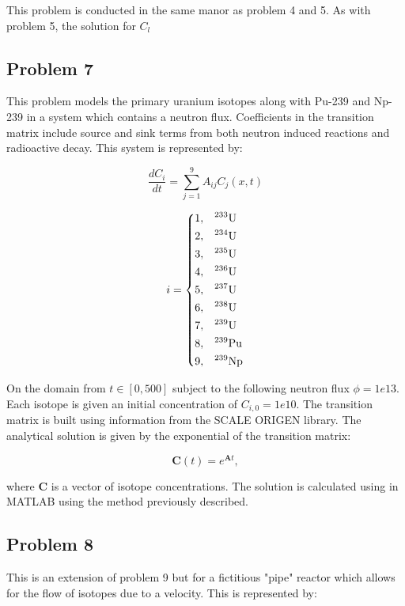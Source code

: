 This problem is conducted in the same manor as problem 4 and 5. As with problem 5, the solution for $C_{l}$ 

\subsection{Problem 7}
This problem models the primary uranium isotopes along with Pu-239 and Np-239 in a system which contains a neutron flux. Coefficients in the transition matrix include source and sink terms from both neutron induced reactions and radioactive decay. This system is represented by:


\begin{equation}
\frac{d C_i}{dt} = \sum^9_{j = 1} A_{ij} C_j (x, t)
\end{equation}

\begin{equation}
i = \begin{dcases}
  1 , & \text{$^{233}$U}  \\
  2 , & \text{$^{234}$U}  \\
  3 , & \text{$^{235}$U}  \\
  4 , & \text{$^{236}$U}  \\
  5 , & \text{$^{237}$U}  \\
  6 , & \text{$^{238}$U}  \\
  7 , & \text{$^{239}$U}  \\
  8 , & \text{$^{239}$Pu} \\
  9 , & \text{$^{239}$Np} \\
\end{dcases}
\end{equation}

\noindent On the domain from $t \in [0, 500]$ subject to the following neutron flux $\phi = 1e13$. Each isotope is given an initial concentration of $C_{i, 0} = 1e10$. The transition matrix is built using information from the SCALE ORIGEN library. The analytical solution is given by the exponential of the transition matrix:

\begin{equation}
   \boldsymbol{C}(t) = e^{\boldsymbol{A}t}, 
\end{equation}

\noindent where $\boldsymbol{C}$ is a vector of isotope concentrations. The solution is calculated using in MATLAB using the method previously described. 


\subsection{Problem 8}
This is an extension of problem 9 but for a fictitious "pipe" reactor which allows for the flow of isotopes due to a velocity. This is represented by:

